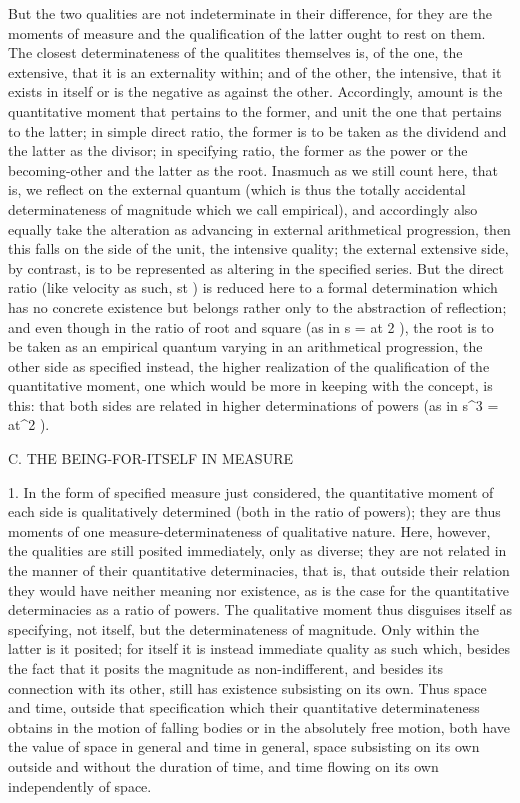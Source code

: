 But the two qualities are not indeterminate in their difference,
for they are the moments of measure
and the qualification of the latter ought to rest on them.
The closest determinateness of the qualitites themselves is,
of the one, the extensive, that it is an externality within;
and of the other, the intensive, that it exists in itself
or is the negative as against the other.
Accordingly, amount is the quantitative moment
that pertains to the former,
and unit the one that pertains to the latter;
in simple direct ratio, the former is to be taken
as the dividend and the latter as the divisor;
in specifying ratio, the former as the power
or the becoming-other and the latter as the root.
Inasmuch as we still count here, that is,
we reflect on the external quantum
(which is thus the totally accidental determinateness of
magnitude which we call empirical),
and accordingly also equally take the alteration
as advancing in external arithmetical progression,
then this falls on the side of the unit, the intensive quality;
the external extensive side, by contrast,
is to be represented as altering in the specified series.
But the direct ratio (like velocity as such, st ) is reduced here
to a formal determination which has no concrete existence
but belongs rather only to the abstraction of reflection;
and even though in the ratio of root and square (as in s = at 2 ),
the root is to be taken as an empirical quantum
varying in an arithmetical progression,
the other side as specified instead,
the higher realization of
the qualification of the quantitative moment,
one which would be more in keeping with the concept, is this:
that both sides are related in higher determinations of powers
(as in s^3 = at^2 ).

C. THE BEING-FOR-ITSELF IN MEASURE

1. In the form of specified measure just considered,
the quantitative moment of each side is qualitatively determined
(both in the ratio of powers);
they are thus moments of
one measure-determinateness of qualitative nature.
Here, however, the qualities are
still posited immediately, only as diverse;
they are not related in the manner
of their quantitative determinacies,
that is, that outside their relation
they would have neither meaning nor existence,
as is the case for the quantitative determinacies
as a ratio of powers.
The qualitative moment thus disguises itself as specifying,
not itself, but the determinateness of magnitude.
Only within the latter is it posited;
for itself it is instead immediate quality as such
which, besides the fact that it
posits the magnitude as non-indifferent,
and besides its connection with its other,
still has existence subsisting on its own.
Thus space and time, outside that specification
which their quantitative determinateness obtains
in the motion of falling bodies
or in the absolutely free motion,
both have the value of space in general and time in general,
space subsisting on its own outside and without the duration of time,
and time flowing on its own independently of space.

